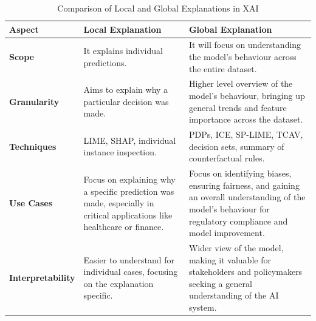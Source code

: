 \documentclass[10pt,journal,compsoc]{IEEEtran}
\begin{document}
\begin{table}[h]
    \centering
    \small
    \begin{tabularx}{\columnwidth}{|p{1.8cm}|X|X|}
        \hline
        \textbf{Aspect}           & \textbf{Local Explanation}                                                                                              & \textbf{Global Explanation}                                                                                                                                    \\
        \hline
        \textbf{Scope}            & It explains individual predictions.                                                                                     & It will focus on understanding the model's behaviour across the entire dataset.                                                                                \\
        \hline
        \textbf{Granularity}      & Aims to explain why a particular decision was made.                                                                     & Higher level overview of the model's behaviour, bringing up general trends and feature importance across the dataset.                                          \\
        \hline
        \textbf{Techniques}       & LIME, SHAP, individual instance inspection.                                                                             & PDPs, ICE, SP-LIME, TCAV, decision sets, summary of counterfactual rules.\cite{phillips2020four}                                                               \\
        \hline
        \textbf{Use Cases}        & Focus on explaining why a specific prediction was made, especially in critical applications like healthcare or finance. & Focus on identifying biases, ensuring fairness, and gaining an overall understanding of the model's behaviour for regulatory compliance and model improvement. \\
        \hline
        \textbf{Interpretability} & Easier to understand for individual cases, focusing on the explanation specific.                                        & Wider view of the model, making it valuable for stakeholders and policymakers seeking a general understanding of the AI system.                                \\
        \hline
    \end{tabularx}
    \caption{Comparison of Local and Global Explanations in XAI}
    \label{tab:xai_comparison}
\end{table}
\end{document}
